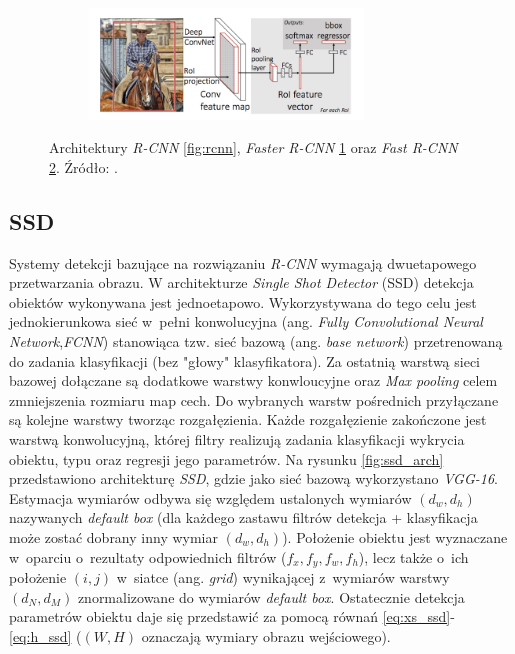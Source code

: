 \begin{figure}
\begin{subfigure}[b]{0.48\textwidth}
         \caption{}
         \label{fig:ffrcnn}
     \end{subfigure}
     \hfill
    \begin{subfigure}[b]{0.9\textwidth}
         \centering
         \includegraphics[width=0.8\textwidth]{images/frcnn.png}
         \caption{}
         \label{fig:frcnn}
     \end{subfigure}
     \hfill
    \caption{Architektury \emph{R-CNN} \ref{fig:rcnn}, \emph{Faster R-CNN} \ref{fig:ffrcnn} oraz \emph{Fast R-CNN} \ref{fig:frcnn}. Źródło: \cite{medium_rcnn}.}
    \label{fig:rcnns}
\end{figure}

\subsection{SSD}
Systemy detekcji bazujące na rozwiązaniu \emph{R-CNN} wymagają dwuetapowego przetwarzania obrazu.
W architekturze \emph{Single Shot Detector} (SSD) \cite{ssd} detekcja obiektów wykonywana jest jednoetapowo.
Wykorzystywana do tego celu jest jednokierunkowa sieć w~pełni konwolucyjna (ang. \emph{Fully Convolutional Neural Network},\emph{FCNN}) stanowiąca tzw. sieć bazową (ang. \emph{base network}) przetrenowaną do zadania klasyfikacji (bez "głowy" klasyfikatora).
Za ostatnią warstwą sieci bazowej dołączane są dodatkowe warstwy konwloucyjne oraz \emph{Max pooling} celem zmniejszenia rozmiaru map cech.
Do wybranych warstw pośrednich przyłączane są kolejne warstwy tworząc rozgałęzienia.
Każde rozgałęzienie zakończone jest warstwą konwolucyjną, której filtry realizują zadania klasyfikacji wykrycia obiektu, typu oraz regresji jego parametrów. 
Na rysunku \ref{fig:ssd_arch} przedstawiono architekturę \emph{SSD}, gdzie jako sieć bazową wykorzystano \emph{VGG-16}. 
Estymacja wymiarów odbywa się względem ustalonych wymiarów $(d_w, d_h)$ nazywanych \emph{default box} (dla każdego zastawu filtrów detekcja + klasyfikacja może zostać dobrany inny wymiar $(d_w, d_h)$).
Położenie obiektu jest wyznaczane w~oparciu o~rezultaty odpowiednich filtrów ($f_x, f_y, f_w, f_h$), lecz także o~ich położenie $(i,j)$ w~siatce (ang. \emph{grid}) wynikającej z~wymiarów warstwy $(d_N, d_M)$ znormalizowane do wymiarów \emph{default box}.
Ostatecznie detekcja parametrów obiektu daje się przedstawić za pomocą równań \eqref{eq:xs_ssd}-\eqref{eq:h_ssd} ($(W, H)$ oznaczają wymiary obrazu wejściowego). 

